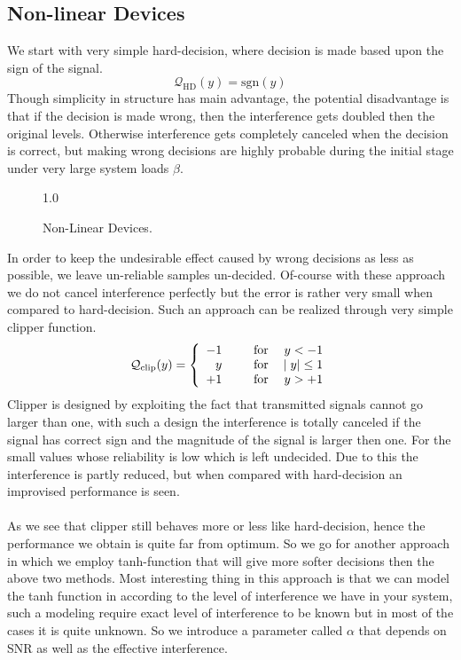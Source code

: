 \subsection{Non-linear Devices}
We start with very simple hard-decision, where decision is made based upon the sign of the signal.
\begin{equation}
\mathcal{Q}_{\mathrm{HD}}(y)=\mathrm{sgn}(y)
\end{equation}
Though simplicity in structure has main advantage, the potential disadvantage is that if the decision is made wrong, then the interference gets doubled then the original levels. Otherwise interference gets completely canceled when the decision is correct, but making wrong decisions are highly probable during the initial stage under very large system loads $\beta$. 
\begin{figure}[htb]
\centerline{  {1.0} }
\caption{Non-Linear Devices.}
\end{figure}
In order to keep the undesirable effect caused by wrong decisions as less as possible, we leave un-reliable samples un-decided. Of-course with these approach we do not cancel interference perfectly but the error is rather very small when compared to hard-decision. Such an approach can be realized through very simple clipper function.
\begin{eqnarray}
\mathcal{Q}_{\mathrm{clip}}(y)=\left\{
\begin{array}{rllr}
-1&\hspace{2mm}&\mathrm{for}&\;y < -1 \\ 
 y&\hspace{2mm}&\mathrm{for}&\vert\; y \vert \leq 1 \\ 
+1&\hspace{2mm}&\mathrm{for}&\;y > +1
\end{array}
\right.
\end{eqnarray}
Clipper is designed by exploiting the fact that transmitted signals cannot go larger than one, with such a design the interference is totally canceled if the signal has correct sign and the magnitude of the signal is larger then one. For the small values whose reliability is low which is left undecided. Due to this the interference is partly reduced, but when compared with hard-decision an improvised performance is seen.\\ \\
As we see that clipper still behaves more or less like hard-decision, hence the performance we obtain is quite far from optimum. So we go for another approach in which we employ tanh-function that will give more softer decisions then the above two methods. Most interesting thing in this approach is that we can model the tanh function in according to the level of interference we have in your system, such a modeling require exact level of interference to be known but in most of the cases it is quite unknown. So we introduce a parameter called $\alpha$ that depends on SNR as well as the effective interference.
